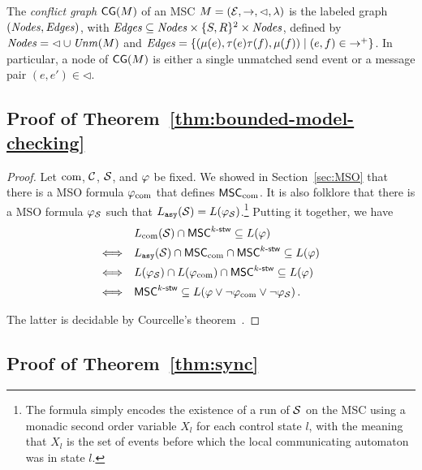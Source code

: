 \begin{definition}
	The \emph{conflict graph} $\mathsf{CG}(M)$ of an MSC $M = (\mathcal{E}, \rightarrow, \lhd, \lambda)$ is the labeled graph $(\mathit{Nodes}, \mathit{Edges})$, with $\mathit{Edges} \subseteq \mathit{Nodes} \times \{S,R\}^2 \times \mathit{Nodes}$, defined by
	$\mathit{Nodes} = {\lhd} \cup \mathit{Unm}(M)$ and $\mathit{Edges} = \{(\mu(e),\tau(e)\tau(f),\mu(f)) \mid (e,f) \in {\to^+}\}$.
In particular, a node of $\mathsf{CG}(M)$ is either a single unmatched send event or a message pair $(e,e') \in {\lhd}$.
\end{definition}


\subsection{Proof of Theorem~\ref{thm:bounded-model-checking}}


\thmBoundedMC*

\begin{proof}
   Let $\textup{com}$, $\mathcal{C}$, $\mathcal{S}$, and $\varphi$ 
   be fixed. We showed in Section~\ref{sec:MSO} 
   that there is a MSO formula
   $\varphi_{\textup{com}}$
   that defines $\mathsf{MSC}_{\textup{com}}$.
   It is also folklore that there is a MSO formula
   $\varphi_{\mathcal{S}}$ such that
   $L_{\mathtt{asy}}(\mathcal{S})=L(\varphi_{\mathcal{S}})$.\footnote{The formula
   simply encodes the existence of a run of $\mathcal{S}$ on the MSC
   using a monadic second order variable $X_l$ for each control
   state $l$, with the meaning that $X_l$ is the set of events
   before which the local communicating automaton was in state $l$.}
   Putting it together, we have
    \[\begin{array}{rl}
    &L_{\textup{com}}(\mathcal{S}) \cap \mathsf{MSC}^{k\textup{-}\mathsf{stw}} \subseteq L(\varphi)\\[1ex]
    \Longleftrightarrow &L_{\mathtt{asy}}(\mathcal{S}) \cap \mathsf{MSC}_{\textup{com}} \cap \mathsf{MSC}^{k\textup{-}\mathsf{stw}} \subseteq L(\varphi)\\[1ex]
    \Longleftrightarrow & L(\varphi_{\mathcal{S}}) \cap L(\varphi_{\textup{com}}) \cap \mathsf{MSC}^{k\textup{-}\mathsf{stw}} \subseteq L(\varphi)\\[1ex]
    \Longleftrightarrow &\mathsf{MSC}^{k\textup{-}\mathsf{stw}} \subseteq L(\varphi \vee \neg \varphi_{\textup{com}}\vee\neg\varphi_{\mathcal{S}})\,.
    \end{array}\]

    The latter is decidable by Courcelle's theorem~\cite{Courcelle10}.
\end{proof}


\subsection{Proof of Theorem~\ref{thm:sync}}
\label{apx:sync}



